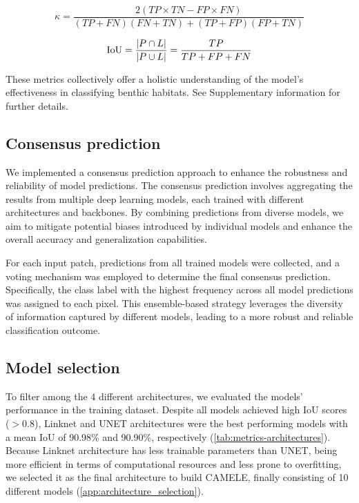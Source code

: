 \begin{equation}\label{eq:kappa}
    \kappa=\frac{2\left(TP\times TN - FP\times FN\right)}{(TP + FN)(FN + TN) +
        (TP + FP)(FP
        + TN)}
\end{equation}

\begin{equation}\label{eq:IoU}
    \text{IoU} = \frac{\abs{P\cap L}}{\abs{P\cup L}}=\frac{TP}{TP + FP + FN}
\end{equation}

These metrics collectively offer a holistic understanding of the model's
effectiveness in classifying benthic habitats. See Supplementary information
for further details.

\subsection{Consensus prediction}

We implemented a consensus prediction approach to enhance the robustness and
reliability of model predictions. The consensus prediction involves aggregating
the results from multiple deep learning models, each trained with different
architectures and backbones. By combining predictions from diverse models, we
aim to mitigate potential biases introduced by individual models and enhance
the overall accuracy and generalization capabilities.

For each input patch, predictions from all trained models were collected, and a
voting mechanism was employed to determine the final consensus prediction.
Specifically, the class label with the highest frequency across all model
predictions was assigned to each pixel. This ensemble-based strategy
leverages the diversity of information captured by different models, leading to
a more robust and reliable classification outcome.

\subsection{Model selection}

To filter among the 4 different architectures, we evaluated the models'
performance in the training dataset. Despite all models achieved high IoU
scores ($> 0.8$), Linknet and UNET architectures were the best performing
models with a mean IoU of 90.98\% and 90.90\%, respectively
(\cref{tab:metrics-architectures}). Because Linknet architecture has less
trainable parameters than UNET, being more efficient in terms of computational
resources and less prone to overfitting, we selected it as the final
architecture to build CAMELE, finally consisting of 10 different models
(\cref{app:architecture_selection}).

